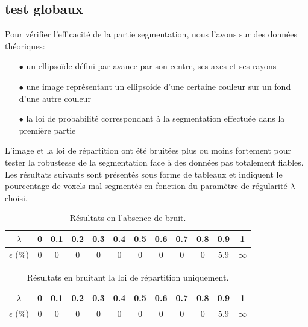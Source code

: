 \documentclass{article}
\begin{document}
\subsection{test globaux}
Pour vérifier l'efficacité de la partie segmentation, nous l'avons sur des données théoriques:
\begin{itemize}
	\item[$\bullet$] un ellipsoïde défini par avance par son centre, ses axes et ses rayons
	\item[$\bullet$] une image représentant un ellipsoide d'une certaine couleur sur un fond d'une autre couleur
	\item[$\bullet$] la loi de probabilité correspondant à la segmentation effectuée dans la première partie
\end{itemize} 
L'image et la loi de répartition ont été bruitées plus ou moins fortement pour tester la robustesse de la segmentation face à des données pas totalement fiables.\\
Les résultats suivants sont présentés sous forme de tableaux et indiquent le pourcentage de voxels mal segmentés en fonction du paramètre de régularité $\lambda$ choisi.

\begin{table}[h!]
\begin{center}
  \begin{tabular}{|c|c|c|c|c|c|c|c|c|c|c|c|}
		\hline
		$\lambda$ & 0 & 0.1& 0.2 & 0.3 & 0.4 & 0.5 & 0.6 & 0.7 & 0.8 & 0.9 & 1\\
		\hline
		$\epsilon$ (\%) & 0 & 0 & 0 & 0 & 0 & 0 & 0 & 0 & 0 & 5.9 & $\infty$\\
		\hline
\end{tabular}
\end{center}
\caption{Résultats en l'absence de bruit.}
\end{table}

\begin{table}[h!]
\begin{center}
  \begin{tabular}{|c|c|c|c|c|c|c|c|c|c|c|c|}
		\hline
		$\lambda$ & 0 & 0.1& 0.2 & 0.3 & 0.4 & 0.5 & 0.6 & 0.7 & 0.8 & 0.9 & 1\\
		\hline
		$\epsilon$ (\%) & 0 & 0 & 0 & 0 & 0 & 0 & 0 & 0 & 0 & 5.9 & $\infty$\\
		\hline
\end{tabular}
\end{center}
\caption{Résultats en bruitant la loi de répartition uniquement.}
\end{table}
\end{document}
